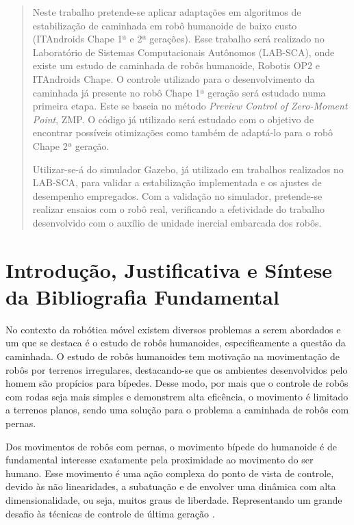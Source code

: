 \newpage
\doublespacing

\begin{abstract}
Neste trabalho pretende-se aplicar adaptações em algoritmos de estabilização de caminhada em robô humanoide de baixo custo (ITAndroids Chape 1ª e 2ª gerações). Esse trabalho será realizado no  Laboratório de Sistemas Computacionais Autônomos (LAB-SCA), onde  existe um estudo de caminhada de robôs humanoide, Robotis OP2 e ITAndroids Chape. O controle utilizado para o desenvolvimento da caminhada já presente no robô Chape 1ª geração será estudado numa primeira etapa. Este se baseia no método \textit{Preview Control of Zero-Moment Point}, ZMP. O código já utilizado será estudado com o objetivo de encontrar possíveis otimizações como também de adaptá-lo para o robô Chape 2ª geração.

Utilizar-se-á do simulador Gazebo, já utilizado em trabalhos realizados no LAB-SCA, para validar a estabilização implementada e os ajustes de desempenho empregados. Com a validação no simulador, pretende-se realizar ensaios com o robô real, verificando a efetividade do trabalho desenvolvido com o auxílio de unidade inercial embarcada dos robôs.
\end{abstract}
\newpage
\section{Introdução, Justificativa e Síntese da Bibliografia Fundamental}



No contexto da robótica móvel existem diversos problemas a serem abordados e um que se destaca é o estudo de robôs humanoides, especificamente a questão da caminhada. O estudo de robôs humanoides tem motivação na movimentação de robôs por terrenos irregulares, destacando-se que os ambientes desenvolvidos pelo homem são propícios para bípedes. Desse modo, por mais que o controle de robôs com rodas seja mais simples e demonstrem alta eficência, o movimento é limitado a terrenos planos, sendo uma solução para o problema a caminhada de robôs com pernas.

Dos movimentos de robôs com pernas, o movimento bípede do humanoide é de fundamental interesse exatamente pela proximidade ao movimento do ser humano. Esse movimento é uma ação complexa do ponto de vista de controle, devido às não linearidades, a subatuação e  de envolver uma dinâmica com alta dimensionalidade, ou seja, muitos graus de liberdade. Representando um grande desafio às técnicas de controle de última geração \cite{tedrake2005}.

